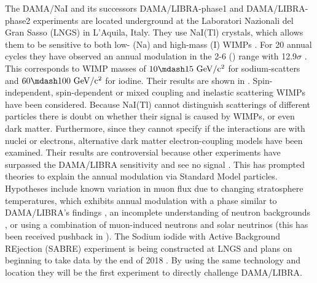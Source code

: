 The DAMA/NaI and its successors DAMA/LIBRA-phase1 and DAMA/LIBRA-phase2 experiments are located underground at the Laboratori Nazionali del
Gran Sasso (LNGS) in L'Aquila, Italy.  They use NaI(Tl) crystals, which allows them to be sensitive to both low- (Na) and high-mass (I) WIMPs
.  For 20 annual cycles they have observed an annual modulation in the
2-6 \kevee ()
range with 12.9$\sigma$ .  This corresponds to WIMP masses of $10 \mdash 15\ \mathrm{GeV/c^2}$ for sodium-scatters
and $60 \mdash 100\ \mathrm{GeV/c^2}$ for iodine.  Their results are shown in .  Spin-independent, spin-dependent or
mixed coupling  and inelastic scattering  WIMPs 
have been considered.  Because NaI(Tl) cannot distinguish scatterings of different
particles there is doubt on whether their signal
is caused by WIMPs, or even dark matter.  Furthermore, since they cannot specify if the interactions are with nuclei or electrons,
alternative dark matter
electron-coupling models  have been examined.  Their results are controversial because other experiments
have surpassed the DAMA/LIBRA sensitivity and see no signal .  This has prompted theories to explain the annual
modulation via
Standard Model particles.  Hypotheses include known variation in muon flux due to changing stratosphere temperatures, which exhibits
annual modulation with a phase similar to DAMA/LIBRA's findings , an incomplete understanding of neutron backgrounds
, or using a combination of muon-induced neutrons and solar neutrinos  (this
has been received pushback in ).  The Sodium iodide with Active Background REjection (SABRE) experiment
is being constructed at LNGS and plans on beginning to take data by the end of 2018 .  By using the same
technology and location they will be the first experiment to directly challenge DAMA/LIBRA.

